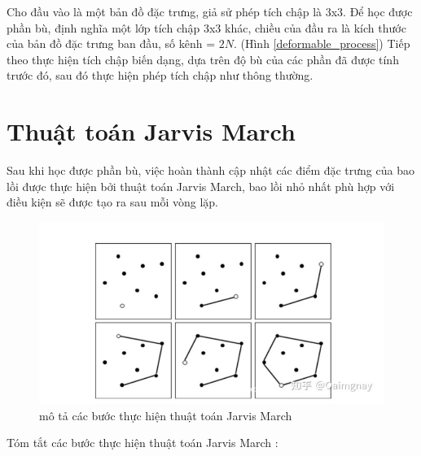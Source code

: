 \documentclass[12pt,a4paper,openany,oneside]{report}
\begin{document}
Cho đầu vào là một bản đồ đặc trưng, giả sử phép tích chập là 3x3. Để học được phần bù, định nghĩa một lớp tích chập 3x3 khác, chiều của đầu ra là kích thước của bản đồ đặc trưng ban đầu, số kênh = $2N$. (Hình \ref{deformable_process}) Tiếp theo thực hiện tích chập biến dạng, dựa trên độ bù của các phần đã được tính trước đó, sau đó thực hiện phép tích chập như thông thường.
\section{Thuật toán Jarvis March}
Sau khi học được phần bù, việc hoàn thành cập nhật các điểm đặc trưng của bao lồi được thực hiện bởi thuật toán Jarvis March, bao lồi nhỏ nhất phù hợp với điều kiện sẽ được tạo ra sau mỗi vòng lặp.

\begin{figure}[ht!]
	\begin{center}
		\includegraphics[width=435px]{./jarvis_march_steps.jpg}
		\caption{mô tả các bước thực hiện thuật toán Jarvis March}
		\label{fig_dhandang1}
	\end{center}
\end{figure} 
Tóm tắt các bước thực hiện thuật toán Jarvis March \cite{Guo_2021CVPR_CFA}:
\end{document}
